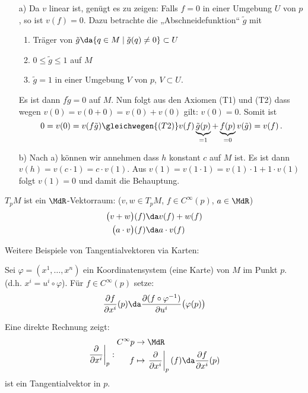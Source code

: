 \documentclass[a4paper,twoside,DIV15,BCOR12mm]{scrbook}
\begin{document}
\begin{beweis}
\begin{itemize}
\item[a)] Da $v$ linear ist, genügt es zu zeigen: Falls $f=0$ in einer Umgebung $U$ von $p$, so ist $v(f)=0$. Dazu betrachte die „Abschneidefunktion“ $\tilde g$ mit 
\begin{enumerate}
\item Träger von $\tilde g \da \{ q\in M \mid \tilde g(q) \ne 0\} \subset U$
\item $0\le \tilde g \le 1$ auf $M$
\item $\tilde g = 1$ in einer Umgebung $V$ von $p$, $V \subset U$.
\end{enumerate}
Es ist dann $f\tilde g = 0$ auf $M$. Nun folgt aus den Axiomen (T1) und (T2) dass wegen $v(0)= v(0+0) = v(0) + v(0)$ gilt: $v(0)=0$. Somit ist
\[
0 = v(0) = v(f\tilde g) \gleichwegen{(T2)} v(f)\underbrace{\tilde g(p)}_{=1} + \underbrace{f(p)}_{=0}v(\tilde g) = v(f)\,.
\]
\item[b)] Nach a) können wir annehmen dass $h$ konstant $c$ auf $M$ ist. Es ist dann $v(h)= v(c\cdot1) = c\cdot v(1)$. Aus $v(1) = v(1\cdot 1) = v(1)\cdot 1 + 1\cdot v(1)$ folgt $v(1)=0$ und damit die Behauptung.
\end{itemize}
\end{beweis}

$T_pM$ ist ein $\MdR$-Vektorraum: ($v,w \in T_pM$, $f\in C^\infty(p)$, $a\in\MdR$)
\begin{align*}
\bigl(v + w\bigr)(f) &\da v(f) + w(f) \\
\bigl(a\cdot v\bigr)(f)   &\da a\cdot v(f) 
\end{align*}


Weitere Beispiele von Tangentialvektoren via Karten:
\newcommand{\ptv}[1]{\left.\frac{\partial}{\partial x^{#1}}\right|_p}
\newcommand{\qtv}[1]{\left.\frac{\partial}{\partial x^{#1}}\right|_q}

Sei $\varphi=(x^1,\ldots,x^n)$ ein Koordinatensystem (eine Karte) von $M$ im Punkt $p$. (d.h. $x^i=u^i\circ\varphi$). Für $f\in C^{\infty}(p)$ setze:
\[
\frac{\partial f}{\partial x^i}(p) \da \frac{\partial (f\circ \varphi^{-1})}{\partial u^i}\bigl(\varphi(p)\bigr) %
\]

Eine direkte Rechnung zeigt:
\[
\ptv{i}:
\begin{aligned}
C^\infty{p} &\to \MdR \\
f &\mapsto \ptv{i}(f) \da \frac{\partial f}{\partial x^i}(p)
\end{aligned}
\]
ist ein Tangentialvektor in $p$.
\end{document}
